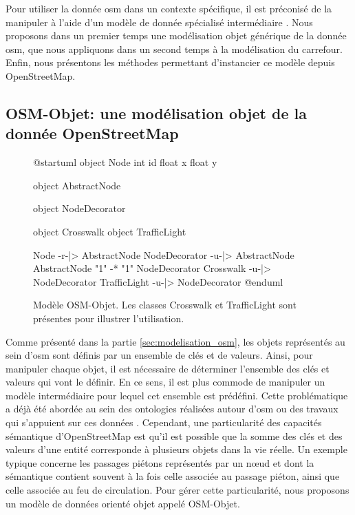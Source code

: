 \label{sec:modelisation_crmodel}

Pour utiliser la donnée \gls{osm} dans un contexte spécifique, il est préconisé de la manipuler à l'aide d'un modèle de donnée spécialisé intermédiaire \citep{Touya2014}. Nous proposons dans un premier temps une modélisation objet générique de la donnée \gls{osm}, que nous appliquons dans un second temps à la modélisation du carrefour. Enfin, nous présentons les méthodes permettant d'instancier ce modèle depuis OpenStreetMap.

\subsection{OSM-Objet: une modélisation objet de la donnée OpenStreetMap}

\begin{figure}[ht]
\centering
\begin{plantuml}

    @startuml
    object Node {
        int id
        float x
        float y
    }

    object AbstractNode

    object NodeDecorator

    object Crosswalk
    object TrafficLight

    Node -r-|> AbstractNode
    NodeDecorator -u-|> AbstractNode
    AbstractNode "1" -* "1" NodeDecorator
    Crosswalk -u-|> NodeDecorator
    TrafficLight -u-|> NodeDecorator
    @enduml
    
\end{plantuml}
\caption[Modèle OSM-Objet.]{Modèle OSM-Objet. Les classes Crosswalk et TrafficLight sont présentes pour illustrer l'utilisation.}
\label{fig:modelisation_osm_objet}
\end{figure}

Comme présenté dans la partie \ref{sec:modelisation_osm}, les objets représentés au sein d'\gls{osm} sont définis par un ensemble de clés et de valeurs. Ainsi, pour manipuler chaque objet, il est nécessaire de déterminer l'ensemble des clés et valeurs qui vont le définir. En ce sens, il est plus commode de manipuler un modèle intermédiaire pour lequel cet ensemble est prédéfini. Cette problématique a déjà été abordée au sein des ontologies réalisées autour d'\gls{osm}\citep{Codescu2011,Hombiat2017} ou des travaux qui s'appuient sur ces données \citep{Touya2014}. Cependant, une particularité des capacités sémantique d'OpenStreetMap est qu'il est possible que la somme des clés et des valeurs d'une entité corresponde à plusieurs objets dans la vie réelle. Un exemple typique concerne les passages piétons représentés par un nœud et dont la sémantique contient souvent à la fois celle associée au passage piéton, ainsi que celle associée au feu de circulation. Pour gérer cette particularité, nous proposons un modèle de données orienté objet appelé OSM-Objet.

